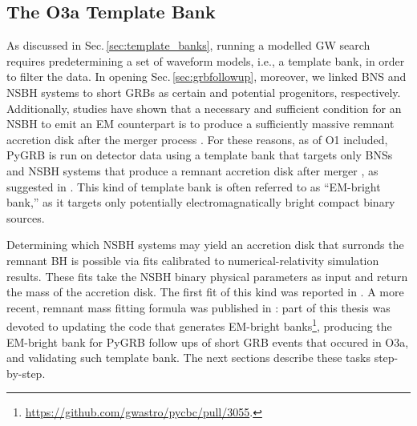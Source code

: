 \documentclass[binding=0.6cm, LaM]{sapthesis}
\begin{document}
\subsection{The O3a Template Bank}
\label{subsec:o3aTemplateBank}
	As discussed in Sec.\,\ref{sec:template_banks}, running a modelled GW search 
	requires predetermining a set of waveform models, i.e., a template bank, in order to filter the data. 
	In opening Sec.\,\ref{sec:grbfollowup}, moreover, we linked BNS and NSBH systems to short GRBs as certain and potential progenitors, respectively.
	Additionally, studies have shown that a necessary and sufficient condition for an NSBH to emit an EM counterpart
	is to produce a sufficiently massive remnant accretion disk after the merger process \cite{}.
	For these reasons, as of O1 included, {\ttfamily PyGRB} is run on detector data using a template bank
	that targets only BNSs and NSBH systems that produce a remnant accretion disk after merger \cite{55,136,161}, as suggested in \cite{162}.  This kind of template bank is often referred to as ``EM-bright bank,'' as it targets only potentially electromagnatically bright compact binary sources.

        Determining which NSBH systems may yield an accretion disk that surronds the remnant BH is possible via fits calibrated to numerical-relativity simulation results.  These fits take the NSBH binary physical parameters as input and return the mass of the accretion disk.
        The first fit of this kind was reported in \cite{50}.
	A more recent, remnant mass fitting formula was published in \cite{54}:
        part of this thesis was devoted to updating the code that generates EM-bright banks\footnote{\url{https://github.com/gwastro/pycbc/pull/3055}.}, producing the EM-bright bank for {\ttfamily PyGRB} follow ups of short GRB events that occured in O3a, and validating such template bank.
	The next sections describe these tasks step-by-step.
\end{document}
